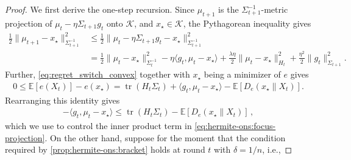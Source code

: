 \documentclass{article}
\theoremstyle{plain}
\theoremstyle{definition}
\theoremstyle{plain}
\newcommand{\tr}{\operatorname{tr}}
\newcommand{\E}{\mathbb E}
\newcommand{\cK}{\mathcal K}
\begin{document}
\begin{proof}
    We first derive the one-step recursion. Since $\mu_{t+1}$ is the
    $\Sigma_{t+1}^{-1}$-metric projection of $\mu_t-\eta\Sigma_{t+1}g_t$
    onto $\cK$, and $x_\star\in\cK$, the Pythagorean inequality gives
    \begin{align}
        \frac12
        \|\mu_{t+1}-x_\star\|_{\Sigma_{t+1}^{-1}}^2
         & \leq
        \frac12
        \|\mu_t-\eta\Sigma_{t+1}g_t-x_\star
        \|_{\Sigma_{t+1}^{-1}}^2
        \nonumber \\
         & =
        \frac12
        \|\mu_t-x_\star\|_{\Sigma_t^{-1}}^2
        -\eta\langle g_t,\mu_t-x_\star\rangle
        +
        \frac{\lambda\eta}{2}
        \|\mu_t-x_\star\|_{H_t}^2
        +
        \frac{\eta^2}{2}
        \|g_t\|_{\Sigma_{t+1}}^2.
        \label{eq:hermite-ons:focus-projection}
    \end{align}
    Further, \eqref{eq:regret_switch_convex} together with $x_\star$ being a minimizer of $e$ gives
    \begin{align}
        0
        \leq
        \E[e(X_t)]-e(x_\star)
        =
        \tr(H_t\Sigma_t)
        +
        \langle g_t,\mu_t-x_\star\rangle
        -
        \E[D_e(x_\star\|X_t)].
        \label{eq:hermite-ons:focus-regret-switch}
    \end{align}
    Rearranging this identity gives
    \begin{align}
        -\langle g_t,\mu_t-x_\star\rangle
        \leq
        \tr(H_t\Sigma_t)
        -
        \E[D_e(x_\star\|X_t)]\,,
        \label{eq:hermite-ons:focus-rearrangement}
    \end{align}
    which we use to control the inner product term in \eqref{eq:hermite-ons:focus-projection}.
    On the other hand, suppose for the moment that the condition required by \cref{prop:hermite-ons:bracket} holds at round $t$ with
    $\delta=1/n$, i.e.,

\end{proof}
\end{document}
